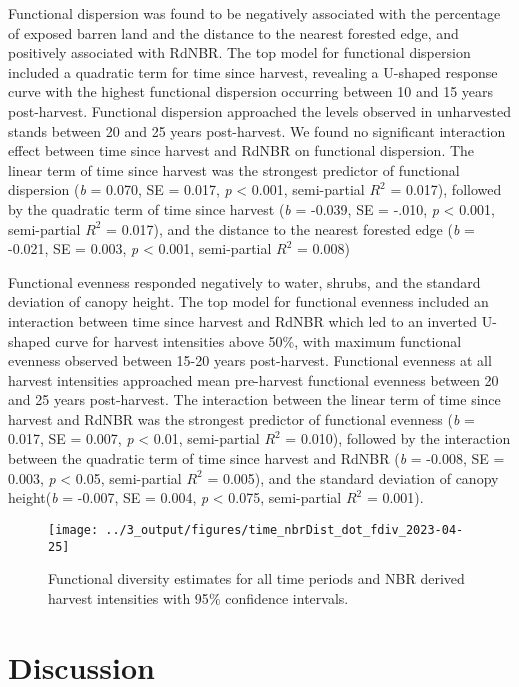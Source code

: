 \documentclass[
  12pt,
]{article}
\begin{document}
Functional dispersion was found to be negatively associated with the percentage of exposed barren land and the distance to the nearest forested edge, and positively associated with RdNBR. The top model for functional dispersion included a quadratic term for time since harvest, revealing a U-shaped response curve with the highest functional dispersion occurring between 10 and 15 years post-harvest. Functional dispersion approached the levels observed in unharvested stands between 20 and 25 years post-harvest. We found no significant interaction effect between time since harvest and RdNBR on functional dispersion. The linear term of time since harvest was the strongest predictor of functional dispersion (\emph{b} = 0.070, SE = 0.017, \emph{p} \textless{} 0.001, semi-partial \(R^2\) = 0.017), followed by the quadratic term of time since harvest (\emph{b} = -0.039, SE = -.010, \emph{p} \textless{} 0.001, semi-partial \(R^2\) = 0.017), and the distance to the nearest forested edge (\emph{b} = -0.021, SE = 0.003, \emph{p} \textless{} 0.001, semi-partial \(R^2\) = 0.008)

Functional evenness responded negatively to water, shrubs, and the standard deviation of canopy height. The top model for functional evenness included an interaction between time since harvest and RdNBR which led to an inverted U-shaped curve for harvest intensities above 50\%, with maximum functional evenness observed between 15-20 years post-harvest. Functional evenness at all harvest intensities approached mean pre-harvest functional evenness between 20 and 25 years post-harvest. The interaction between the linear term of time since harvest and RdNBR was the strongest predictor of functional evenness (\emph{b} = 0.017, SE = 0.007, \emph{p} \textless{} 0.01, semi-partial \(R^2\) = 0.010), followed by the interaction between the quadratic term of time since harvest and RdNBR (\emph{b} = -0.008, SE = 0.003, \emph{p} \textless{} 0.05, semi-partial \(R^2\) = 0.005), and the standard deviation of canopy height(\emph{b} = -0.007, SE = 0.004, \emph{p} \textless{} 0.075, semi-partial \(R^2\) = 0.001).

\begin{figure}[H]
\texttt{[image: ../3\_output/figures/time\_nbrDist\_dot\_fdiv\_2023-04-25]} \caption{Functional diversity estimates for all time periods and NBR derived harvest intensities with 95$\%$  confidence intervals.}\label{fig:dotFDiv}
\end{figure}

\hypertarget{discussion}{%
\section{Discussion}\label{discussion}}
\end{document}
